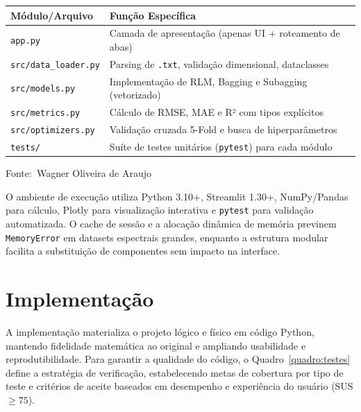 \documentclass[12pt,a4paper]{article}
\newcommand{\oautor}{Wagner Oliveira de Araujo}
\begin{document}
\begin{quadro}[ht]
\centering
\small
\caption{Estrutura modular e responsabilidades}
\label{quadro:estrutura}
\begin{threeparttable}
\begin{tabularx}{\textwidth}{|l|X|} \hline
\textbf{Módulo/Arquivo} & \textbf{Função Específica} \\ \hline
\texttt{app.py} & Camada de apresentação (apenas UI + roteamento de abas) \\ \hline
\texttt{src/data\_loader.py} & Parsing de \texttt{.txt}, validação dimensional, dataclasses \\ \hline
\texttt{src/models.py} & Implementação de RLM, Bagging e Subagging (vetorizado) \\ \hline
\texttt{src/metrics.py} & Cálculo de RMSE, MAE e R² com tipos explícitos \\ \hline
\texttt{src/optimizers.py} & Validação cruzada 5-Fold e busca de hiperparâmetros \\ \hline
\texttt{tests/} & Suíte de testes unitários (\texttt{pytest}) para cada módulo \\ \hline
\end{tabularx}
\begin{tablenotes}[flushleft]
\footnotesize
\item Fonte:~\oautor
\end{tablenotes}
\end{threeparttable}
\end{quadro}

O ambiente de execução utiliza Python 3.10+, Streamlit 1.30+, NumPy/Pandas para cálculo, Plotly para visualização interativa e \texttt{pytest} para validação automatizada. O cache de sessão e a alocação dinâmica de memória previnem \texttt{MemoryError} em datasets espectrais grandes, enquanto a estrutura modular facilita a substituição de componentes sem impacto na interface.

\section{Implementação}

A implementação materializa o projeto lógico e físico em código Python, mantendo fidelidade matemática ao original e ampliando usabilidade e reprodutibilidade. Para garantir a qualidade do código, o Quadro~\ref{quadro:testes} define a estratégia de verificação, estabelecendo metas de cobertura por tipo de teste e critérios de aceite baseados em desempenho e experiência do usuário (SUS $\ge 75$).
\end{document}
